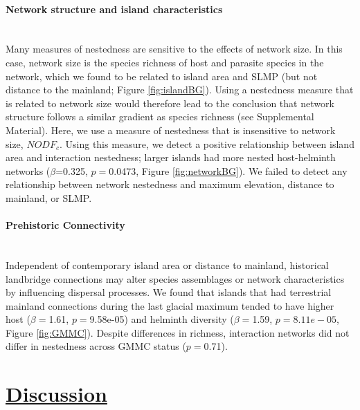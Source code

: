 \paragraph*{Network structure and island characteristics}\mbox{}\\ 
Many measures of nestedness are sensitive to the effects of network size. In this case, network size is the species richness of host and parasite species in the network, which we found to be related to island area and SLMP (but not distance to the mainland; Figure \ref{fig:islandBG}). Using a nestedness measure that is related to network size would therefore lead to the conclusion that network structure follows a similar gradient as species richness (see Supplemental Material). Here, we use a measure of nestedness that is insensitive to network size, $NODF_c$. Using this measure, we detect a positive relationship between island area and interaction nestedness; larger islands had more nested host-helminth networks ($\beta$=0.325, $p=$0.0473, Figure \ref{fig:networkBG}). We failed to detect any relationship between network nestedness and maximum elevation, distance to mainland, or SLMP. 

\paragraph*{Prehistoric Connectivity}\mbox{}\\ 
Independent of contemporary island area or distance to mainland, historical landbridge connections may alter species assemblages or network characteristics by influencing dispersal processes. We found that islands that had terrestrial mainland connections during the last glacial maximum tended to have higher host ($\beta=$1.61, $p=$9.58e-05) and helminth diversity ($\beta=$1.59, $p=8.11e-05$, Figure \ref{fig:GMMC}). Despite differences in richness, interaction networks did not differ in nestedness across GMMC status ($p=$0.71).  




\section*{\textbf{\underline{Discussion}}}


